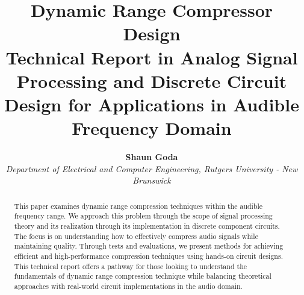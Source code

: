 \documentclass[10pt]{article}
\title{
    \textbf{\huge Dynamic Range Compressor Design}\\
    Technical Report in Analog Signal Processing and Discrete Circuit Design for Applications in Audible Frequency Domain
}
\author{
    \textbf{\Large Shaun Goda}\\
    \textit{\normalsize Department of Electrical and Computer Engineering, Rutgers University - New Brunswick}
}
\begin{document}
    \maketitle   

    \begin{abstract}
        This paper examines dynamic range compression techniques within the audible frequency range. We approach this problem through the scope of signal processing theory and its realization through its implementation in discrete component circuits. The focus is on understanding how to effectively compress audio signals while maintaining quality. Through tests and evaluations, we present methods for achieving efficient and high-performance compression techniques using hands-on circuit designs. This technical report offers a pathway for those looking to understand the fundamentals of dynamic range compression technique while balancing theoretical approaches with real-world circuit implementations in the audio domain.
    \end{abstract}


    
\end{document}
